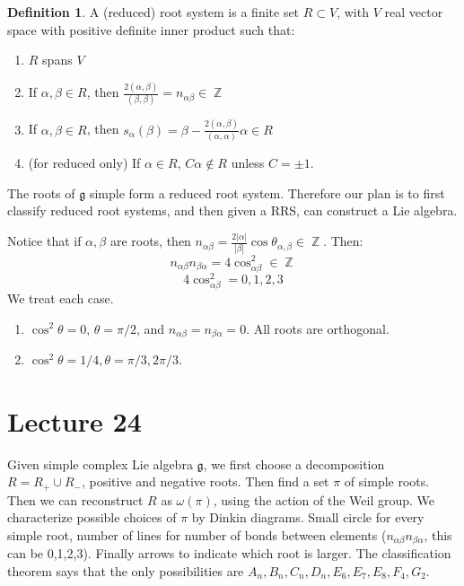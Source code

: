 \documentclass[12 pt]{article}
\DeclareMathOperator {\Z} {\mathbb{Z}}
\theoremstyle{plain}
\theoremstyle{definition}
\newtheorem{defn}{Definition}
\theoremstyle{remark}
\begin{document}
\begin{defn}
A (reduced) root system is a finite set $R \subset V$, with $V$ real vector space with positive definite inner product such that:
\begin{enumerate}
\item $R$ spans $V$
\item If $\alpha, \beta \in R$, then $\frac{2(\alpha, \beta)}{(\beta, \beta)} = n_{\alpha \beta} \in \Z$
\item If $\alpha, \beta\in R$, then $s_{\alpha}(\beta) = \beta - \frac{2(\alpha, \beta)}{(\alpha, \alpha)} \alpha \in R$
\item (for reduced only) If $\alpha \in R$, $C \alpha \not \in R$ unless $C = \pm 1$.
\end{enumerate}
\end{defn}
The roots of $\mathfrak{g}$ simple form a reduced root system. Therefore our plan is to first classify reduced root systems, and then given a RRS, can construct a Lie algebra.

Notice that if $\alpha, \beta$ are roots, then $n_{\alpha \beta} = \frac{2|\alpha|}{|\beta|} \cos \theta_{\alpha, \beta} \in \Z$. Then:
\[      n_{\alpha \beta} n_{\beta \alpha} = 4 \cos^2_{\alpha \beta}  \in \Z    \]
\[      4 \cos^2_{\alpha \beta} = 0, 1,2,3      \]
We treat each case.
\begin{enumerate}
\item $\cos^2\theta = 0$, $\theta = \pi/2$, and $n_{\alpha \beta} = n_{\beta \alpha} = 0$. All roots are orthogonal.
\item $\cos^2 \theta = 1/4, \theta = \pi/3, 2\pi/3$.
\end{enumerate}


\section*{Lecture 24}
Given simple complex Lie algebra $\mathfrak{g}$, we first choose a decomposition $R = R_+ \cup R_-$, positive and negative roots. Then find a set $\pi$ of simple roots. Then we can reconstruct $R$ as $\omega(\pi)$, using the action of the Weil group. We characterize possible choices of $\pi$ by Dinkin diagrams. Small circle for every simple root, number of lines for number of bonds between elements ($n_{\alpha \beta} n_{\beta \alpha}$, this can be 0,1,2,3). Finally arrows to indicate which root is larger. The classification theorem says that the only possibilities are $A_n, B_n, C_n, D_n, E_6, E_7, E_8, F_4, G_2$.
\end{document}
